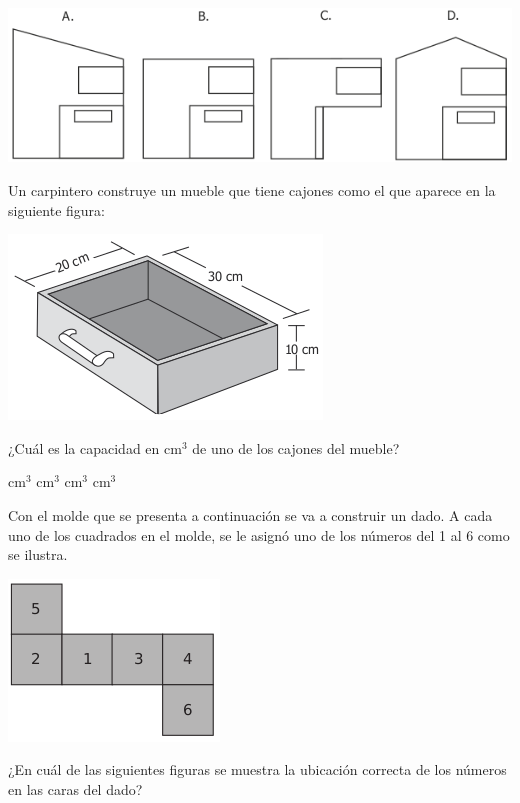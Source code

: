 \documentclass[10pt,letterpaper,addpoints]{exam}
\begin{document}
\begin{multicols}{2}
\begin{questions}
 \begin{center}
 \includegraphics[scale=.45]{Images/Pantallazo-1.png} 
 \end{center}
 \question Un carpintero construye un mueble que tiene cajones como el que aparece en la siguiente figura:
 \begin{center}
 \includegraphics[scale=.6]{Images/Pantallazo-2.png} 
 \end{center}
 ¿Cuál es la capacidad en cm$^{3}$ de uno de los cajones del mueble?
 \begin{choices}
  cm$^{3}$
  cm$^{3}$
  cm$^{3}$
  cm$^{3}$
 \end{choices}
 \question Con el molde que se presenta a continuación se va a construir un dado. A cada uno de los cuadrados en el molde, se le asignó uno de los números del 1 al 6 como se ilustra.
 \begin{center}
 \includegraphics[scale=.6]{Images/Pantallazo-3.png} 
 \end{center}
 ¿En cuál de las siguientes figuras se muestra la ubicación correcta de los números en las caras del dado?
 \begin{center}

\end{center}
\end{questions}
\end{multicols}
\end{document}
